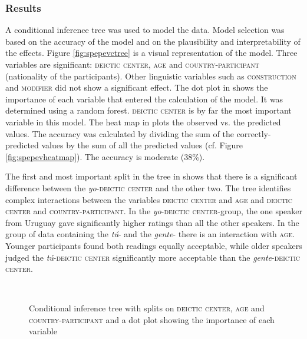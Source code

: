 \subsubsection{Results}

A conditional inference tree  was used to model the data. Model selection was based on the accuracy of the model and  on the plausibility and interpretability of the effects. Figure \ref{fig:spepevctree} is a visual representation of the model. Three variables are significant: \textsc{deictic center}, \textsc{age} and \textsc{country-participant} (nationality of the participants). Other  linguistic variables such as \textsc{construction} and \textsc{modifier} did not show a significant effect. 
The dot plot in  shows the importance of each variable that entered the calculation of the model. It was determined using a random forest.  \textsc{deictic center} is by far the most important variable in this model.  The heat map in  plots the observed vs. the predicted values. The accuracy was calculated by dividing the sum of the correctly-predicted values by the sum of all the predicted values  (cf. Figure \ref{fig:spepevheatmap}). The accuracy  is moderate (38\%).\largerpage[2]

The first and most important split in the tree in   shows  that there is a significant difference between the \textit{yo}-\textsc{deictic center} and the other two. The tree identifies complex interactions between the variables \textsc{deictic center} and \textsc{age} and \textsc{deictic center} and \textsc{country-participant}. In  the \textit{yo}-\textsc{deictic center}-group, the one speaker  from Uruguay gave significantly higher ratings than all the other speakers. In the group of data containing the \emph{tú}- and the \emph{gente}-\textsc{} there is  an interaction with \textsc{age}. Younger participants found both readings equally acceptable, while older speakers judged  the \emph{tú}-\textsc{deictic center}  significantly more acceptable than the \emph{gente}-\textsc{deictic center}.\pagebreak

\begin{figure}
	\smallskip\\
	\caption{Conditional inference tree with splits on \textsc{deictic center}, \textsc{age} and \textsc{country-participant} and a dot plot showing the importance of each variable \label{fig:spevepctree}}
\end{figure}


